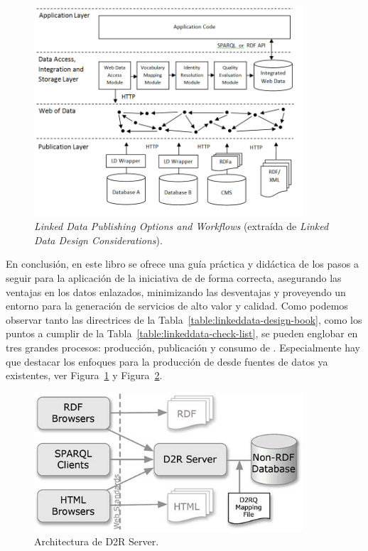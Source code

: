 \begin{figure}[!htb]
\centering
	\includegraphics[width=10cm]{images/phd/Consumingarchitecture1_small}
\caption{\textit{Linked Data Publishing Options and Workflows} (extraída de \textit{Linked Data Design Considerations}).}
\label{fig:patterns-production}
\end{figure}

En conclusión, en este libro se ofrece una guía práctica y didáctica de los pasos a seguir para la aplicación
de la iniciativa de \linkeddata de forma correcta, asegurando las ventajas en los datos enlazados, minimizando las desventajas
y proveyendo un entorno para la generación de servicios de alto valor y calidad. 
Como podemos observar tanto las directrices de la Tabla~\ref{table:linkeddata-design-book}, como
los puntos a cumplir de la Tabla~\ref{table:linkeddata-check-list}, se pueden englobar en tres grandes procesos: producción,
publicación y consumo de \linkeddata. Especialmente hay que destacar los enfoques para la producción de \linkeddata desde
fuentes de datos ya existentes, ver Figura~\ref{fig:patterns-production} y Figura~\ref{fig:patterns-consum}.

\begin{figure}[!htb]
\centering
	\includegraphics[width=10cm]{images/phd/D2RServerArchitecture}
\caption{Architectura de D2R Server.}
\label{fig:patterns-consum}
\end{figure}


